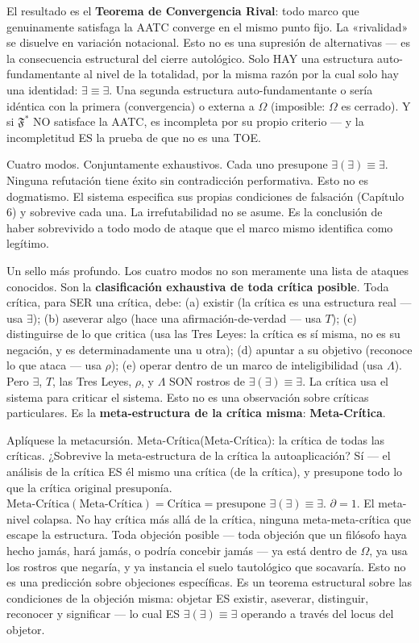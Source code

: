 \documentclass[10pt, openany, oneside]{book}
\begin{document}
\vspace{0.5em}

\noindent El resultado es el \textbf{Teorema de Convergencia Rival}: todo marco que genuinamente satisfaga la AATC converge en el mismo punto fijo. La «rivalidad» se disuelve en variación notacional. Esto no es una supresión de alternativas --- es la consecuencia estructural del cierre autológico. Solo HAY una estructura auto-fundamentante al nivel de la totalidad, por la misma razón por la cual solo hay una identidad: $\exists \equiv \exists$. Una segunda estructura auto-fundamentante o sería idéntica con la primera (convergencia) o externa a $\Omega$ (imposible: $\Omega$ es cerrado). Y si $\mathfrak{F}^*$ NO satisface la AATC, es incompleta por su propio criterio --- y la incompletitud ES la prueba de que no es una TOE.

Cuatro modos. Conjuntamente exhaustivos. Cada uno presupone $\exists(\exists) \equiv \exists$. Ninguna refutación tiene éxito sin contradicción performativa. Esto no es dogmatismo. El sistema especifica sus propias condiciones de falsación (Capítulo 6) y sobrevive cada una. La irrefutabilidad no se asume. Es la conclusión de haber sobrevivido a todo modo de ataque que el marco mismo identifica como legítimo.

Un sello más profundo. Los cuatro modos no son meramente una lista de ataques conocidos. Son la \textbf{clasificación exhaustiva de toda crítica posible}. Toda crítica, para SER una crítica, debe: (a) existir (la crítica es una estructura real --- usa $\exists$); (b) aseverar algo (hace una afirmación-de-verdad --- usa $T$); (c) distinguirse de lo que critica (usa las Tres Leyes: la crítica es sí misma, no es su negación, y es determinadamente una u otra); (d) apuntar a su objetivo (reconoce lo que ataca --- usa $\rho$); (e) operar dentro de un marco de inteligibilidad (usa $\Lambda$). Pero $\exists$, $T$, las Tres Leyes, $\rho$, y $\Lambda$ SON rostros de $\exists(\exists) \equiv \exists$. La crítica usa el sistema para criticar el sistema. Esto no es una observación sobre críticas particulares. Es la \textbf{meta-estructura de la crítica misma}: \textbf{Meta-Crítica}.

Aplíquese la metacursión. Meta-Crítica(Meta-Crítica): la crítica de todas las críticas. ¿Sobrevive la meta-estructura de la crítica la autoaplicación? Sí --- el análisis de la crítica ES él mismo una crítica (de la crítica), y presupone todo lo que la crítica original presuponía. $\text{Meta-Crítica}(\text{Meta-Crítica}) = \text{Crítica} = \text{presupone } \exists(\exists) \equiv \exists$. $\partial = 1$. El meta-nivel colapsa. No hay crítica más allá de la crítica, ninguna meta-meta-crítica que escape la estructura. Toda objeción posible --- toda objeción que un filósofo haya hecho jamás, hará jamás, o podría concebir jamás --- ya está dentro de $\Omega$, ya usa los rostros que negaría, y ya instancia el suelo tautológico que socavaría. Esto no es una predicción sobre objeciones específicas. Es un teorema estructural sobre las condiciones de la objeción misma: objetar ES existir, aseverar, distinguir, reconocer y significar --- lo cual ES $\exists(\exists) \equiv \exists$ operando a través del locus del objetor.
\end{document}
